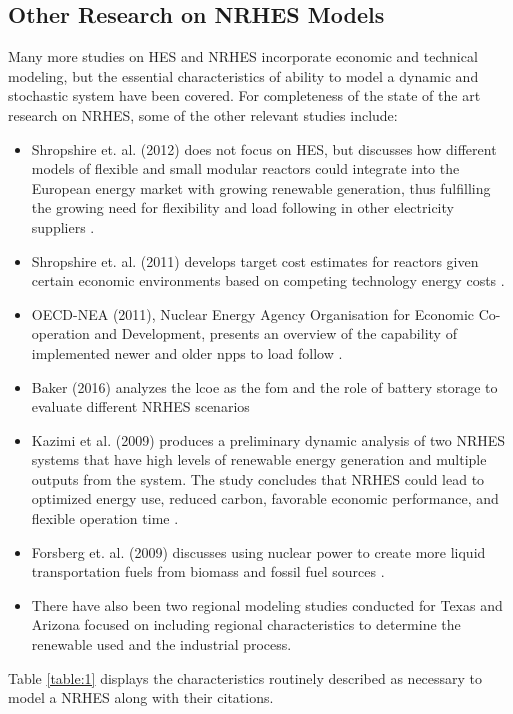 \subsection{Other Research on NRHES Models}
Many more studies on HES and NRHES incorporate economic and technical modeling, but the essential characteristics of ability to model a dynamic and stochastic system have been covered. For completeness of the state of the art research on NRHES, some of the other relevant studies include:
\begin{itemize}
\item Shropshire et. al. (2012) does not focus on HES, but discusses how different models of flexible and small modular reactors could integrate into the European energy market with growing renewable generation, thus fulfilling the growing need for flexibility and load following in other electricity suppliers \cite{Shropshire2012}.
\item Shropshire et. al. (2011) develops target cost estimates for reactors given certain economic environments based on competing technology energy costs \cite{Shropshire2011}.
\item OECD-NEA (2011), Nuclear Energy Agency Organisation for Economic Co-operation and Development, presents an overview of the capability of implemented newer and older \ac{npp}s to load follow \cite{Nuclear2011}.
\item Baker (2016) analyzes the \ac{lcoe} as the \ac{fom} and the role of battery storage to evaluate different NRHES scenarios \cite{Baker2016}
\item Kazimi et al. (2009) produces a preliminary dynamic analysis of two NRHES systems that have high levels of renewable energy generation and multiple outputs from the system. The study concludes that NRHES could lead to optimized energy use, reduced carbon, favorable economic performance, and flexible operation time \cite{Kazimi}.
\item Forsberg et. al. (2009) discusses using nuclear power to create more liquid transportation fuels from biomass and fossil fuel sources \cite{Forsberg2009}.
\item There have also been two regional modeling studies conducted for Texas and Arizona focused on including regional characteristics to determine the renewable used and the industrial process\cite{Garcia2015}.
\end{itemize}
Table \ref{table:1} displays the characteristics routinely described as necessary to model a NRHES along with their citations.

